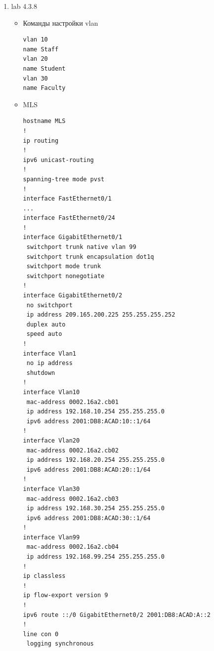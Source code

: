 \documentclass[a4paper,14pt]{extarticle}
\begin{document}
\begin{enumerate}
\begin{itemize}
                Пинги не проходят. Компьютеры находятся в разных подсетях.
            \item \textbf{Какой сети VLAN назначен интерфейс G0/1?}
                VLAN 1
            \item \textbf{Пинг от PC1 до PC3. Эхо-запросы по-прежнему должны не проходить между узлами. Дайте пояснение.}\par
                У свича до сих пор не настроен trunk до маршрутизатора
            \item \textbf{Как с помощью команды show vlan можно определить, что интерфейс — это магистральный порт?}\par
                Этот интерфейс не будет отображаться в sh vlan.
             \item \textbf{Какие адреса используют PC1 и PC3 в качестве адресов шлюза по умолчанию?}\par
                Адрес подинтерфейса
        \end{itemize}
        \item lab 4.3.8
        \begin{itemize}
            \item  Команды настройки vlan
            \begin{lstlisting}
vlan 10 
name Staff
vlan 20 
name Student
vlan 30 
name Faculty
            \end{lstlisting}
            \item MLS
                \begin{lstlisting}
hostname MLS
!
ip routing
!
ipv6 unicast-routing
!
spanning-tree mode pvst
!
interface FastEthernet0/1
...
interface FastEthernet0/24
!
interface GigabitEthernet0/1
 switchport trunk native vlan 99
 switchport trunk encapsulation dot1q
 switchport mode trunk
 switchport nonegotiate
!
interface GigabitEthernet0/2
 no switchport
 ip address 209.165.200.225 255.255.255.252
 duplex auto
 speed auto
!
interface Vlan1
 no ip address
 shutdown
!
interface Vlan10
 mac-address 0002.16a2.cb01
 ip address 192.168.10.254 255.255.255.0
 ipv6 address 2001:DB8:ACAD:10::1/64
!
interface Vlan20
 mac-address 0002.16a2.cb02
 ip address 192.168.20.254 255.255.255.0
 ipv6 address 2001:DB8:ACAD:20::1/64
!
interface Vlan30
 mac-address 0002.16a2.cb03
 ip address 192.168.30.254 255.255.255.0
 ipv6 address 2001:DB8:ACAD:30::1/64
!
interface Vlan99
 mac-address 0002.16a2.cb04
 ip address 192.168.99.254 255.255.255.0
!
ip classless
!
ip flow-export version 9
!
ipv6 route ::/0 GigabitEthernet0/2 2001:DB8:ACAD:A::2
!
line con 0
 logging synchronous

\end{lstlisting}
\end{itemize}
\end{enumerate}
\end{document}

